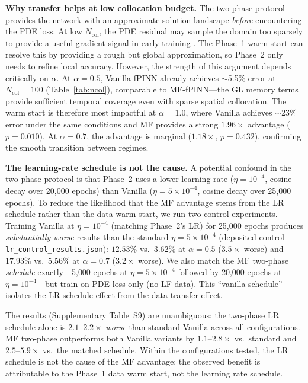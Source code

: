 \documentclass[11pt]{article}
\newcommand{\Ncol}{N_{\mathrm{col}}}
\begin{document}
\textbf{Why transfer helps at low collocation budget.} The two-phase protocol provides the network with an approximate solution landscape \emph{before} encountering the PDE loss. At low $\Ncol$, the PDE residual may sample the domain too sparsely to provide a useful gradient signal in early training \cite{wang2021understanding}. The Phase~1 warm start can resolve this by providing a rough but global approximation, so Phase~2 only needs to refine local accuracy. However, the strength of this argument depends critically on $\alpha$. At $\alpha = 0.5$, Vanilla fPINN already achieves $\sim$5.5\% error at $\Ncol = 100$ (Table~\ref{tab:ncol}), comparable to MF-fPINN---the GL memory terms provide sufficient temporal coverage even with sparse spatial collocation. The warm start is therefore most impactful at $\alpha = 1.0$, where Vanilla achieves $\sim$23\% error under the same conditions and MF provides a strong $1.96\times$ advantage ($p = 0.010$). At $\alpha = 0.7$, the advantage is marginal ($1.18\times$, $p = 0.432$), confirming the smooth transition between regimes.

\textbf{The learning-rate schedule is not the cause.} A potential confound in the two-phase protocol is that Phase~2 uses a lower learning rate ($\eta = 10^{-4}$, cosine decay over 20{,}000 epochs) than Vanilla ($\eta = 5 \times 10^{-4}$, cosine decay over 25{,}000 epochs). To reduce the likelihood that the MF advantage stems from the LR schedule rather than the data warm start, we run two control experiments. Training Vanilla at $\eta = 10^{-4}$ (matching Phase~2's LR) for 25{,}000 epochs produces \emph{substantially worse} results than the standard $\eta = 5 \times 10^{-4}$ (deposited control \texttt{lr\_control\_results.json}): $12.53\%$ vs.\ $3.62\%$ at $\alpha = 0.5$ ($3.5\times$ worse) and $17.93\%$ vs.\ $5.56\%$ at $\alpha = 0.7$ ($3.2\times$ worse). We also match the MF two-phase \emph{schedule} exactly---5{,}000 epochs at $\eta = 5 \times 10^{-4}$ followed by 20{,}000 epochs at $\eta = 10^{-4}$---but train on PDE loss only (no LF data). This ``vanilla schedule'' isolates the LR schedule effect from the data transfer effect.

The results (Supplementary Table~S9) are unambiguous: the two-phase LR schedule alone is $2.1$--$2.2\times$ \emph{worse} than standard Vanilla across all configurations. MF two-phase outperforms both Vanilla variants by $1.1$--$2.8\times$ vs.\ standard and $2.5$--$5.9\times$ vs.\ the matched schedule. Within the configurations tested, the LR schedule is not the cause of the MF advantage: the observed benefit is attributable to the Phase~1 data warm start, not the learning rate schedule.
\end{document}
